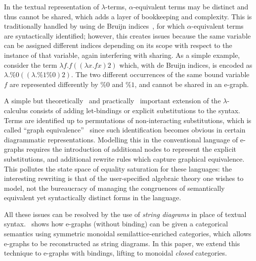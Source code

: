 In the textual representation of $\lambda$-terms, $\alpha$-equivalent terms may be distinct and thus cannot be shared, which adds a layer of bookkeeping and complexity.
This is traditionally handled by using de Bruijn indices~\cite{de1972lambda}, for which $\alpha$-equivalent terms are syntactically identified; however, this creates issues because the same variable can be assigned different indices depending on its scope with respect to the instance of that variable, again interfering with sharing.
As a simple example, consider the term $\lambda f . f ((\lambda x . f x) 2)$ which, with de Bruijn indices,  is encoded as $\lambda . \%0 ((\lambda . \%1 \%0) 2)$.
The two different occurrences of the same bound variable $f$ are represented differently by $\%0$ and $\%1$, and cannot be shared in an e-graph.

A simple but theoretically~\cite{AbadiExplicitSubst} and practically~\cite{anf} important extension of the $\lambda$-calculus consists of adding let-bindings or explicit substitutions to the syntax.
Terms are identified up to permutations of non-interacting substitutions, which is called \enquote{graph equivalence}~\cite{accattoli2014nonstandard} since such identification becomes obvious in certain diagrammatic representations.
Modelling this in the conventional language of e-graphs requires the introduction of additional nodes to represent the explicit substitutions, and additional rewrite rules which capture graphical equivalence.
This pollutes the state space of equality saturation for these languages: the interesting rewriting is that of the user-specified algebraic theory one wishes to model,
not the bureaucracy of managing the congruences of semantically equivalent yet syntactically distinct forms in the language.

All these issues can be resolved by the use of \emph{string diagrams} in place of textual syntax.
\citet{tiurin2025equivalencehypergraphsdporewriting}~shows how e-graphs (without binding) can be given a categorical semantics using symmetric monoidal semilattice-enriched categories, which allows e-graphs to be reconstructed as string diagrams.
In this paper, we extend this technique to e-graphs with bindings, lifting to monoidal \emph{closed} categories.

